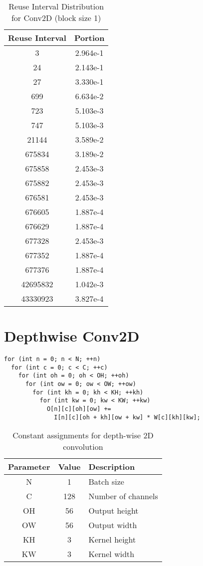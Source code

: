 \documentclass[conference]{article}
\begin{document}
\begin{table}[H]
\centering
\begin{tabular}{|c|c|}
    \hline
    Reuse Interval & Portion \\ 
    \hline
    3 & 2.964e-1 \\ 
    24 & 2.143e-1 \\ 
    27 & 3.330e-1 \\ 
    699 & 6.634e-2 \\ 
    723 & 5.103e-3 \\ 
    747 & 5.103e-3 \\ 
    21144 & 3.589e-2 \\ 
    675834 & 3.189e-2 \\ 
    675858 & 2.453e-3 \\ 
    675882 & 2.453e-3 \\ 
    676581 & 2.453e-3 \\ 
    676605 & 1.887e-4 \\ 
    676629 & 1.887e-4 \\ 
    677328 & 2.453e-3 \\ 
    677352 & 1.887e-4 \\ 
    677376 & 1.887e-4 \\ 
    42695832 & 1.042e-3 \\ 
    43330923 & 3.827e-4 \\ 
    \hline
\end{tabular}
\caption{Reuse Interval Distribution for Conv2D (block size 1)}
\end{table}


\section{Depthwise Conv2D}
\begin{verbatim}
for (int n = 0; n < N; ++n)
  for (int c = 0; c < C; ++c)
    for (int oh = 0; oh < OH; ++oh)
      for (int ow = 0; ow < OW; ++ow)
        for (int kh = 0; kh < KH; ++kh)
          for (int kw = 0; kw < KW; ++kw)
            O[n][c][oh][ow] +=
              I[n][c][oh + kh][ow + kw] * W[c][kh][kw];
\end{verbatim}

\begin{table}[H]
\centering
\begin{tabular}{|c|c|l|}
\hline
Parameter & Value & Description \\
\hline
N & 1 & Batch size \\
C & 128 & Number of channels \\
OH & 56 & Output height \\
OW & 56 & Output width \\
KH & 3 & Kernel height \\
KW & 3 & Kernel width \\
\hline
\end{tabular}
\caption{Constant assignments for depth-wise 2D convolution}
\end{table}
\end{document}
